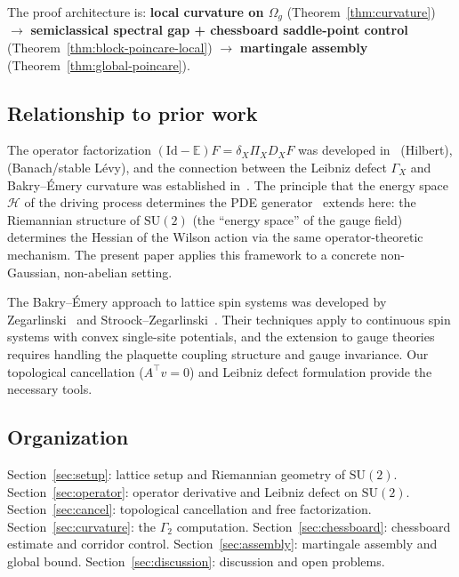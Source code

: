 \documentclass[11pt,a4paper]{article}
\theoremstyle{plain}
\theoremstyle{definition}
\theoremstyle{remark}
\newcommand{\Id}{\mathrm{Id}}
\newcommand{\E}{\mathbb{E}}
\newcommand{\SU}{\mathrm{SU}}
\newcommand{\cH}{\mathcal{H}}
\begin{document}
The proof architecture is: \textbf{local curvature on $\Omega_g$}
(Theorem~\ref{thm:curvature}) $\to$ \textbf{semiclassical spectral
gap + chessboard saddle-point control}
(Theorem~\ref{thm:block-poincare-local}) $\to$
\textbf{martingale assembly}
(Theorem~\ref{thm:global-poincare}).

\subsection{Relationship to prior work}

The operator factorization $(\Id - \E)F = \delta_X \Pi_X D_X F$
was developed in~\cite{Fontes2026a} (Hilbert),
\cite{Fontes2026d} (Banach/stable L\'evy), and the connection between
the Leibniz defect $\Gamma_X$ and Bakry--\'Emery curvature was
established in~\cite{Fontes2026e,Fontes2026f}. The principle that
the energy space $\cH$ of the driving process determines the PDE
generator~\cite{Fontes2026i} extends here: the Riemannian structure
of $\SU(2)$ (the ``energy space'' of the gauge field) determines
the Hessian of the Wilson action via the same operator-theoretic
mechanism. The present paper
applies this framework to a concrete non-Gaussian, non-abelian setting.

The Bakry--\'Emery approach to lattice spin systems was developed by
Zegarlinski~\cite{Zegarlinski1996} and
Stroock--Zegarlinski~\cite{StroockZegarlinski1992}. Their techniques
apply to continuous spin systems with convex single-site potentials,
and the extension to gauge theories requires handling the plaquette
coupling structure and gauge invariance. Our topological cancellation
($A^\top v = 0$) and Leibniz defect formulation provide the necessary
tools.


\subsection{Organization}

Section~\ref{sec:setup}: lattice setup and Riemannian geometry of $\SU(2)$.
Section~\ref{sec:operator}: operator derivative and Leibniz defect on $\SU(2)$.
Section~\ref{sec:cancel}: topological cancellation and free factorization.
Section~\ref{sec:curvature}: the $\Gamma_2$ computation.
Section~\ref{sec:chessboard}: chessboard estimate and corridor control.
Section~\ref{sec:assembly}: martingale assembly and global bound.
Section~\ref{sec:discussion}: discussion and open problems.


\end{document}
